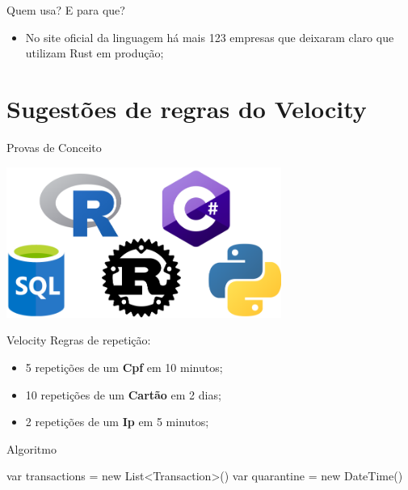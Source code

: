 \documentclass[aspectratio=169]{beamer}
\begin{document}
\begin{frame}{Quem usa? E para que?}
	\begin{itemize}
		\item No site oficial da linguagem há mais 123 empresas que deixaram claro que utilizam Rust em produção;
	\end{itemize}
\end{frame}

\section{Sugestões de regras do Velocity}

\begin{frame}{Provas de Conceito}
	\begin{center}
		\includegraphics[width=9.0cm]{imgs/battle.png}	
	\end{center}
\end{frame}


\begin{frame}{Velocity}
	Regras de repetição:
	\begin{itemize}
		\item 5 repetições de um \textbf{Cpf} em 10 minutos;
		\item 10 repetições de um \textbf{Cartão} em 2 dias;
		\item 2 repetições de um \textbf{Ip} em 5 minutos;
	\end{itemize}

	\begin{chronology}[5]{1}{10}{80ex}[\textwidth]
	\end{chronology}
\end{frame}

\begin{frame}{Algoritmo}
	\begin{algorithm}[H]
		var transactions = new List<Transaction>()\;
		var quarantine = new DateTime()\;
		\vspace{0.2cm}
	\end{algorithm}
\end{frame}
\end{document}
